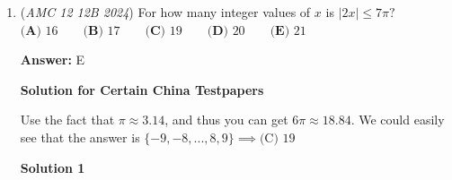 \begin{enumerate}
\textbf{Solution 2}

Factoring out $7!$ gives 
 \[7!(10\cdot9\cdot8-1\cdot6!).\] Since $10\cdot9\cdot8=6!=720$, the answer is $\boxed{\text{(B) }0}$ 

 Factoring $6!$ also works, it just makes the expression in the parenthesis a little harder to compute.

 



\textbf{Solution 3}

Note that $10! - 7! \cdot 6!$ must be divisible by $7$, since 
 \[10! - 7! \cdot 6!=7!(10\cdot9\cdot8\cdot6!)=7\cdot(6!\cdot10\cdot9\cdot8\cdot6!)\] and $\boxed{\text{(B) }0}$ is the only option divisible by $7$.

 



\textbf{Solution 4}

$10! - 7! \cdot 6!$ can be split into two parts, $10!$ and $7! \cdot 6!$. We can break the $6!$ into $(2 \cdot 4)(3 \cdot 5 \cdot 6)$The $2 \cdot 4$ part makes $8$, and the $3 \cdot 5 \cdot 6$ part makes $90$, which is $9 \cdot 10$. We still have the 7!, and we can multiply it by $8 \cdot 9 \cdot 10$. This is clearly equivalent to $10!$, so our solution is $10! - 10! =$$\boxed{\text{(B) }0}$.

 



\textbf{Solution 5}

$10! = 3,628,800$, $7! = 5,040$, and $6! = 720$. $5,040 \cdot 720 = 3,628,800$. Therefore, $3,628,800 - 3,628,800 = \boxed{\text{(B) }0}$.

 -pepper2831

 -minor edits by blakezhang

 


	\item (\textit{AMC 12 12B 2024}) For how many integer values of $x$ is $|2x|\leq 7\pi?$
$\textbf{(A) }16 \qquad\textbf{(B) }17\qquad\textbf{(C) }19\qquad\textbf{(D) }20\qquad\textbf{(E) }21$

 \textbf{Answer: }E



\textbf{Solution for Certain China Testpapers}

Use the fact that $\pi \approx 3.14$, and thus you can get $6\pi \approx 18.84$. We could easily see that the answer is $\{-9,-8,...,8,9\}\implies\boxed{\text{(C) }19}$




\textbf{Solution 1}


\end{enumerate}
